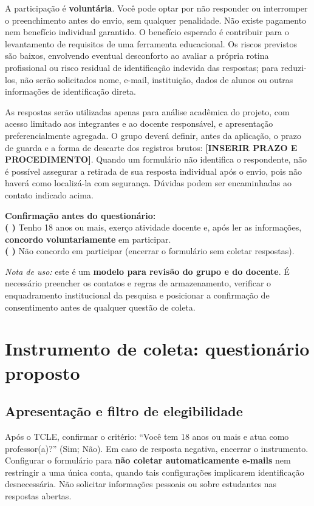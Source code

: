 \documentclass[12pt,a4paper,oneside]{report}
\begin{document}
A participação é \textbf{voluntária}. Você pode optar por não responder ou interromper o preenchimento antes do envio, sem qualquer penalidade. Não existe pagamento nem benefício individual garantido. O benefício esperado é contribuir para o levantamento de requisitos de uma ferramenta educacional. Os riscos previstos são baixos, envolvendo eventual desconforto ao avaliar a própria rotina profissional ou risco residual de identificação indevida das respostas; para reduzi-los, não serão solicitados nome, e-mail, instituição, dados de alunos ou outras informações de identificação direta.

As respostas serão utilizadas apenas para análise acadêmica do projeto, com acesso limitado aos integrantes e ao docente responsável, e apresentação preferencialmente agregada. O grupo deverá definir, antes da aplicação, o prazo de guarda e a forma de descarte dos registros brutos: \textbf{[INSERIR PRAZO E PROCEDIMENTO]}. Quando um formulário não identifica o respondente, não é possível assegurar a retirada de sua resposta individual após o envio, pois não haverá como localizá-la com segurança. Dúvidas podem ser encaminhadas ao contato indicado acima.

\noindent\textbf{Confirmação antes do questionário:}\\
\textbf{( )} Tenho 18 anos ou mais, exerço atividade docente e, após ler as informações, \textbf{concordo voluntariamente} em participar.\\
\textbf{( )} Não concordo em participar (encerrar o formulário sem coletar respostas).

\noindent\textit{Nota de uso:} este é um \textbf{modelo para revisão do grupo e do docente}. É necessário preencher os contatos e regras de armazenamento, verificar o enquadramento institucional da pesquisa e posicionar a confirmação de consentimento antes de qualquer questão de coleta.

\section{Instrumento de coleta: questionário proposto}
\subsection{Apresentação e filtro de elegibilidade}
Após o TCLE, confirmar o critério: ``Você tem 18 anos ou mais e atua como professor(a)?'' (Sim; Não). Em caso de resposta negativa, encerrar o instrumento. Configurar o formulário para \textbf{não coletar automaticamente e-mails} nem restringir a uma única conta, quando tais configurações implicarem identificação desnecessária. Não solicitar informações pessoais ou sobre estudantes nas respostas abertas.
\end{document}
